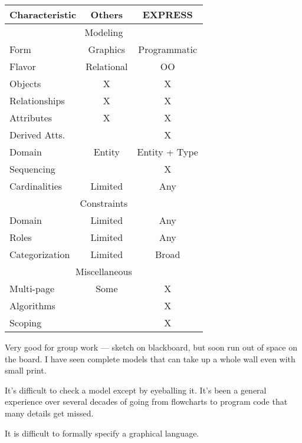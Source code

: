 
\begin{center}
\begin{tabular}{|l|c|c|} \hline
Characteristic & Others     & EXPRESS \\ \hline
\multicolumn{3}{|c|}{Modeling} \\ \hline
Form           & Graphics   & Programmatic \\  
Flavor         & Relational & OO \\
Objects        &  X         & X \\
Relationships  &  X         & X \\
Attributes     &  X         & X \\
Derived Atts.  &            & X \\
Domain         & Entity     & Entity + Type \\
Sequencing     &            & X \\
Cardinalities  & Limited    & Any \\  \hline
\multicolumn{3}{|c|}{Constraints} \\ \hline
Domain         & Limited    & Any \\
Roles          & Limited    & Any \\
Categorization & Limited    & Broad \\ \hline
\multicolumn{3}{|c|}{Miscellaneous} \\ \hline
Multi-page     & Some       & X \\
Algorithms     &            & X \\
Scoping        &            & X \\ \hline
\end{tabular} 
\end{center}

\begin{remarks}
\remintro


    Very good for group work --- sketch on blackboard, but soon run
out of space on the board. I have seen complete models that can
take up a whole wall even with small print.

    It's difficult to check a model except by eyeballing it. It's been
a general experience over several decades of going from flowcharts to
program code that many details get missed.

    It is difficult to formally specify a graphical language. 

\remend
\end{remarks}

